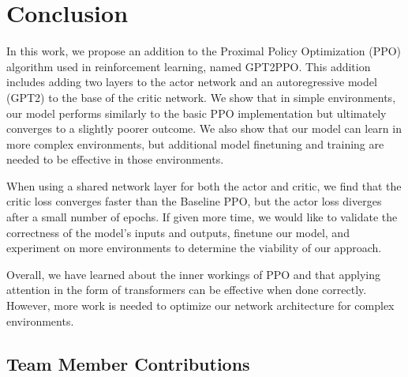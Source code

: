 \documentclass[conference]{IEEEtran}
\begin{document}

\section{Conclusion}
\label{sec:conclusion}


In this work, we propose an addition to the Proximal Policy Optimization (PPO) algorithm used in reinforcement learning, named GPT2PPO. This addition includes adding two layers to the actor network and an autoregressive model (GPT2) to the base of the critic network. We show that in simple environments, our model performs similarly to the basic PPO implementation but ultimately converges to a slightly poorer outcome. We also show that our model can learn in more complex environments, but additional model finetuning and training are needed to be effective in those environments.

When using a shared network layer for both the actor and critic, we find that the critic loss converges faster than the Baseline PPO, but the actor loss diverges after a small number of epochs. If given more time, we would like to validate the correctness of the model's inputs and outputs, finetune our model, and experiment on more environments to determine the viability of our approach.

Overall, we have learned about the inner workings of PPO and that applying attention in the form of transformers can be effective when done correctly. However, more work is needed to optimize our network architecture for complex environments.





\appendix
\subsection{Team Member Contributions}
\end{document}

